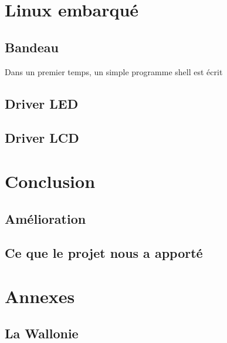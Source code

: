 \documentclass[a4paper,12pt]{article}
\begin{document}
\newpage
\section{Linux embarqué}
  
  \subsection{Bandeau}
  	Dans un premier temps, un simple programme shell est écrit 
  \subsection{Driver LED}
  
  \subsection{Driver LCD}

\newpage
\section*{Conclusion}
  
  \subsection*{Amélioration}
  
  \subsection*{Ce que le projet nous a apporté}

\newpage
\section*{Annexes}

  \subsection*{La Wallonie}
\end{document}
